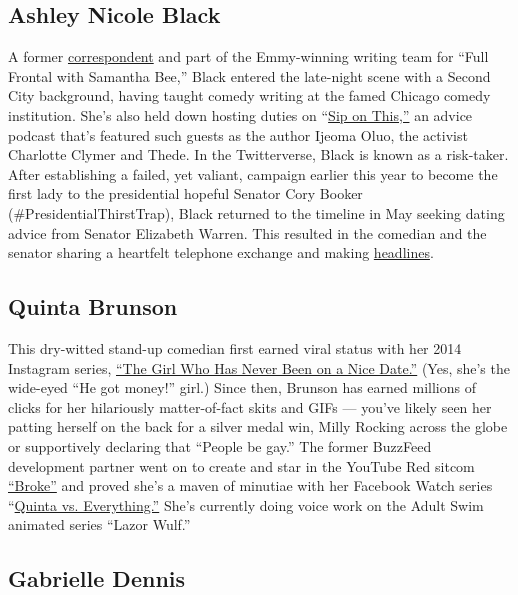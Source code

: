 \hypertarget{ashley-nicole-black}{%
\subsection{Ashley Nicole Black}\label{ashley-nicole-black}}

A former \href{https://youtu.be/81dhho3JuK4}{correspondent} and part of
the Emmy-winning writing team for ``Full Frontal with Samantha Bee,''
Black entered the late-night scene with a Second City background, having
taught comedy writing at the famed Chicago comedy institution. She's
also held down hosting duties on
``\href{https://www.damemagazine.com/podcasts/siponthis/}{Sip on
This,''} an advice podcast that's featured such guests as the author
Ijeoma Oluo, the activist Charlotte Clymer and Thede. In the
Twitterverse, Black is known as a risk-taker. After establishing a
failed, yet valiant, campaign earlier this year to become the first lady
to the presidential hopeful Senator Cory Booker
(\#PresidentialThirstTrap), Black returned to the timeline in May
seeking dating advice from Senator Elizabeth Warren. This resulted in
the comedian and the senator sharing a heartfelt telephone exchange and
making
\href{https://www.buzzfeednews.com/article/laurenstrapagiel/elizabeth-warren-followed-through-on-giving-this-woman-love}{headlines}.

\hypertarget{quinta-brunson}{%
\subsection{Quinta Brunson}\label{quinta-brunson}}

This dry-witted stand-up comedian first earned viral status with her
2014 Instagram series, \href{https://youtu.be/op2pK_w8_oY}{``The Girl
Who Has Never Been on a Nice Date.''} (Yes, she's the wide-eyed ``He got
money!'' girl.) Since then, Brunson has earned millions of clicks for
her hilariously matter-of-fact skits and GIFs --- you've likely seen her
patting herself on the back for a silver medal win, Milly Rocking across
the globe or supportively declaring that ``People be gay.'' The former
BuzzFeed development partner went on to create and star in the YouTube
Red sitcom \href{https://youtu.be/Ya0QRhZAKJQ}{``Broke''} and proved
she's a maven of minutiae with her Facebook Watch series
``\href{https://www.facebookcorewwwi.onion/QuintaVsEverything/}{Quinta
vs. Everything.''} She's currently doing voice work on the Adult Swim
animated series ``Lazor Wulf.''

\hypertarget{gabrielle-dennis}{%
\subsection{Gabrielle Dennis}\label{gabrielle-dennis}}

